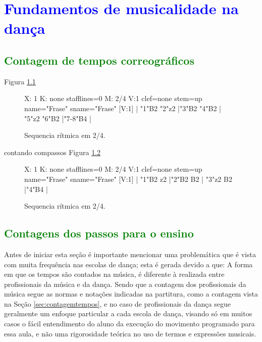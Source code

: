
\chapter{\textcolor{blue}{Fundamentos de musicalidade na dança}}




\section{\textcolor{green}{Contagem de tempos correográficos}}

Figura \ref{fig:contarfrase1} 

\begin{figure}[h]
    \centering
 \begin{abc}[name=abc-contarfrase1]
%
X: 1 %
K: none stafflines=0 %
M:  2/4
V:1 clef=none stem=up name="Frase"   sname="Frase"
%
[V:1] | "1"B2 "2"z2  |"3"B2 "4"B2  | "5"z2 "6"B2  |"7-8"B4  |
%       
\end{abc}
    \caption{Sequencia rítmica em 2/4.}\label{fig:contarfrase1}
\end{figure}

contando compassos Figura \ref{fig:contarfrase2} 

\begin{figure}[h]
    \centering
 \begin{abc}[name=abc-contarfrase2]
%
X: 1 %
K: none stafflines=0 %
M:  2/4
V:1 clef=none stem=up name="Frase"   sname="Frase"
%
[V:1] | "1"B2 z2  |"2"B2 B2  | "3"z2 B2  |"4"B4  |
%       
\end{abc}
    \caption{Sequencia rítmica em 2/4.}\label{fig:contarfrase2}
\end{figure}

\section{\textcolor{green}{Contagens dos passos para o ensino}}
Antes de iniciar esta seção é importante mencionar uma
problemática que é vista com muita frequência nas escolas de dança; 
esta é gerada devido a que: A forma em que os tempos são contados 
na música, é
diferente à realizada entre profissionais da música e da dança. 
Sendo que a contagem dos profissionais da música segue as normas
e notações indicadas na partitura, como a contagem vista na Seção \ref{sec:contagemtempos}, 
e no caso de profissionais da dança segue geralmente um enfoque 
particular a cada escola de dança, visando só em muitos casos o fácil entendimento do aluno da
execução do movimento programado para essa aula, e não uma rigorosidade teórica no uso de termos e 
expressões musicais.


